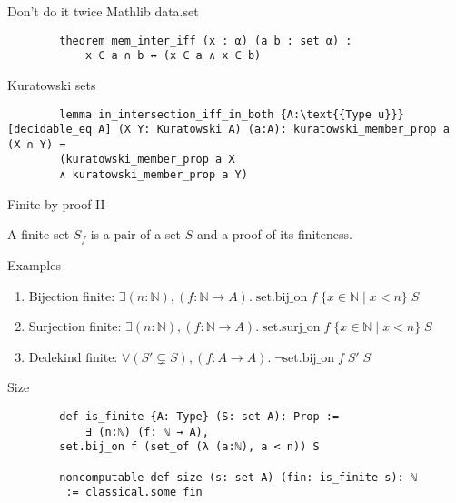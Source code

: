 \documentclass{beamer}
\begin{document}
    \begin{frame}[fragile]{Don't do it twice}
        Mathlib data.set
        \begin{lstlisting}
        theorem mem_inter_iff (x : α) (a b : set α) :
            x ∈ a ∩ b ↔ (x ∈ a ∧ x ∈ b)
        \end{lstlisting}
        Kuratowski sets
        \begin{lstlisting}
        lemma in_intersection_iff_in_both {A:\text{{Type u}}} [decidable_eq A] (X Y: Kuratowski A) (a:A): kuratowski_member_prop a (X ∩ Y) = 
        (kuratowski_member_prop a X 
        ∧ kuratowski_member_prop a Y)
        \end{lstlisting}

    \end{frame}
    \begin{frame}{Finite by proof II}
        \begin{definition}
            A finite set $S_f$ is a pair of a set $S$ and a proof of its finiteness.
        \end{definition}
        \pause
        Examples
        \begin{enumerate}
            \item Bijection finite: $\exists (n:\mathbb{N}), (f: \mathbb{N} \to A).\; \text{{set.bij\_on}}\; f \;\{ x \in \mathbb{N} \mid x < n\} \;S$
            \item Surjection finite: $\exists (n:\mathbb{N}), (f: \mathbb{N} \to A).\; \text{{set.surj\_on}}\; f \;\{ x \in \mathbb{N} \mid x < n\} \;S $
            \item Dedekind finite: $\forall (S' \subsetneq S), (f: A \to A).\; \neg \text{{set.bij\_on}}\; f\; S'\; S$
        \end{enumerate}
    \end{frame}
    \begin{frame}[fragile]{Size}
        \begin{lstlisting}
        def is_finite {A: Type} (S: set A): Prop := 
            ∃ (n:ℕ) (f: ℕ → A), 
        set.bij_on f (set_of (λ (a:ℕ), a < n)) S

        noncomputable def size (s: set A) (fin: is_finite s): ℕ
         := classical.some fin
    \end{lstlisting}
    \end{frame}
\end{document}
